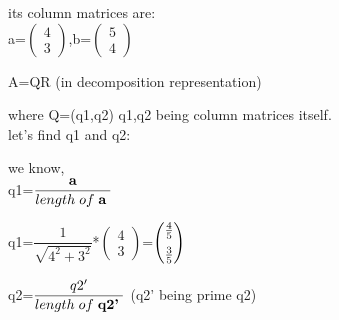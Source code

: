 \documentclass[a4paper,12pt]{article}
\begin{document}
\vspace{0.5cm}

its column matrices are:\\
 
a=$\begin{pmatrix} 4 \\ 3 \end{pmatrix}$,b=$\begin{pmatrix} 5 \\ 4 \end{pmatrix}$\\

\vspace{0.5cm}

A=QR      \hspace{4cm}(in decomposition representation)\\

\vspace{0.5cm}

where Q=(q1,q2)
 q1,q2 being column matrices itself.\\
 
let's find q1 and q2:

we know,\\


q1=$\dfrac{\textbf{a}}{length \hspace{1mm}  of \hspace{1mm} \textbf{a} \hspace{1mm} }$\\
\vspace{1cm}

q1=$\dfrac{1}{\sqrt{4^2+3^2}}$*$\begin{pmatrix} 4 \\ 3 \end{pmatrix}$=$\begin{pmatrix} \frac{4}{5} \vspace*{2mm} \\ \frac{3}{5} \end{pmatrix}$
\\
\vspace{1cm}


q2=$\dfrac{q2'}{length \hspace{1mm}  of \hspace{1mm} \textbf{q2'} \hspace{1mm} }$      \hspace{4cm}(q2' being prime q2)\\

\vspace{1cm}
\end{document}
